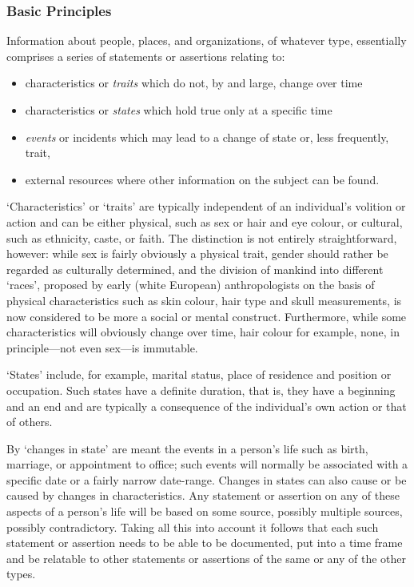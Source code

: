 \subsubsection[{Basic Principles}]{Basic Principles}\label{NDPERSbp}\par
Information about people, places, and organizations, of whatever type, essentially comprises a series of statements or assertions relating to: \begin{itemize}
\item characteristics or \textit{traits} which do not, by and large, change over time
\item characteristics or \textit{states} which hold true only at a specific time
\item \textit{events} or incidents which may lead to a change of state or, less frequently, trait,
\item external resources where other information on the subject can be found.
\end{itemize} \par
‘Characteristics’ or ‘traits’ are typically independent of an individual's volition or action and can be either physical, such as sex or hair and eye colour, or cultural, such as ethnicity, caste, or faith. The distinction is not entirely straightforward, however: while sex is fairly obviously a physical trait, gender should rather be regarded as culturally determined, and the division of mankind into different ‘races’, proposed by early (white European) anthropologists on the basis of physical characteristics such as skin colour, hair type and skull measurements, is now considered to be more a social or mental construct. Furthermore, while some characteristics will obviously change over time, hair colour for example, none, in principle—not even sex—is immutable.\par
‘States’ include, for example, marital status, place of residence and position or occupation. Such states have a definite duration, that is, they have a beginning and an end and are typically a consequence of the individual's own action or that of others.\par
By ‘changes in state’ are meant the events in a person's life such as birth, marriage, or appointment to office; such events will normally be associated with a specific date or a fairly narrow date-range. Changes in states can also cause or be caused by changes in characteristics. Any statement or assertion on any of these aspects of a person's life will be based on some source, possibly multiple sources, possibly contradictory. Taking all this into account it follows that each such statement or assertion needs to be able to be documented, put into a time frame and be relatable to other statements or assertions of the same or any of the other types.\par
